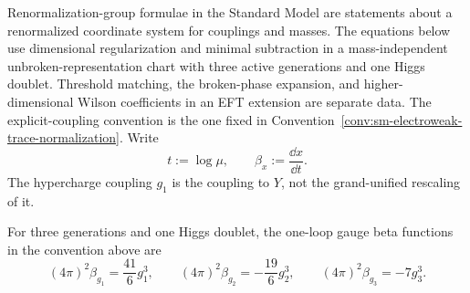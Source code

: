 Renormalization-group formulae in the Standard Model are statements about a
renormalized coordinate system for couplings and masses.  The equations below
use dimensional regularization and minimal subtraction in a mass-independent
unbroken-representation chart with three active generations and one Higgs
doublet.  Threshold matching, the broken-phase expansion, and
higher-dimensional Wilson coefficients in an EFT extension are separate data.
The explicit-coupling convention is
the one fixed in Convention~\ref{conv:sm-electroweak-trace-normalization}.
Write
\[
  t:=\log\mu,\qquad \beta_x:=\frac{\dd x}{\dd t}.
\]
The hypercharge coupling \(g_1\) is the coupling to \(Y\), not the
grand-unified rescaling of it.

\begin{lemma}
\label{lem:sm-one-loop-gauge-beta}
For three generations and one Higgs doublet, the one-loop gauge beta
functions in the convention above are
\begin{equation}
  (4\pi)^2\beta_{g_1}
  =
  \frac{41}{6}g_1^3,\qquad
  (4\pi)^2\beta_{g_2}
  =
  -\frac{19}{6}g_2^3,\qquad
  (4\pi)^2\beta_{g_3}
  =
  -7g_3^3 .
  \label{eq:sm-one-loop-gauge-beta}
\end{equation}
\end{lemma}

